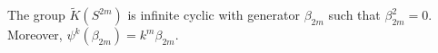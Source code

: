 The group $\tilde{K}(S^{2m})$ is infinite cyclic with generator $\beta_{2m}$ such that $\beta_{2m}^2 = 0$. Moreover, $\psi^k(\beta_{2m}) = k^m \beta_{2m}$.
